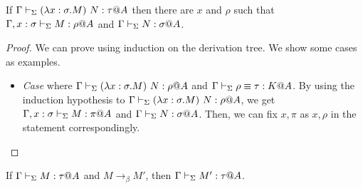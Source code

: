 \begin{lemma}
	\begin{item}
	      \item If $\G \V (\lambda x:\sigma.M)\ N: \tau@A$ then there are $x$ and $\rho$ such that
	      $\Gamma, x:\sigma \vdash_\Sigma M : \rho @A$ and $\Gamma \vdash_\Sigma N:\sigma @ A$.
	\end{item}
\end{lemma}

\begin{proof}
	We can prove using induction on the derivation tree.
	We show some cases as examples.
	\begin{itemize}
		\item \textit{Case} \TConv{} where $\G \V (\lambda x:\sigma.M)\ N: \rho@A$ and $\Gamma \vdash_\Sigma \rho \equiv \tau : K @A$.
			  By using the induction hypothesis to $\G \V (\lambda x:\sigma.M)\ N: \rho@A$, 
			  we get $\Gamma, x:\sigma \vdash_\Sigma M : \pi @A$ and $\Gamma \vdash_\Sigma N:\sigma @ A$.
		      Then, we can fix $x, \pi$ as $x, \rho$ in the statement correspondingly.
	\end{itemize}
\end{proof}
	
\begin{theorem}
	If $\G\V M:\tau@A$ and $M \longrightarrow_{\beta} M'$, then $\G\V M':\tau@A$.
\end{theorem}
	

